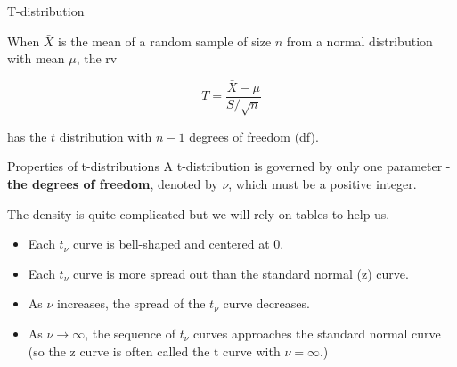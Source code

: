 \documentclass[
  ignorenonframetext,
]{beamer}
\providecommand{\tightlist}{%
  \setlength{\itemsep}{0pt}\setlength{\parskip}{0pt}}\usepackage{longtable,booktabs,array}
\begin{document}
\begin{frame}{T-distribution}
\protect\hypertarget{t-distribution}{}
\begin{tcolorbox}[enhanced jigsaw, titlerule=0mm, colbacktitle=quarto-callout-important-color!10!white, opacityback=0, bottomrule=.15mm, colback=white, colframe=quarto-callout-important-color-frame, arc=.35mm, title=\textcolor{quarto-callout-important-color}{\faExclamation}\hspace{0.5em}{Theorem}, toprule=.15mm, breakable, coltitle=black, leftrule=.75mm, bottomtitle=1mm, left=2mm, rightrule=.15mm, toptitle=1mm, opacitybacktitle=0.6]

When \(\bar{X}\) is the mean of a random sample of size \(n\) from a
normal distribution with mean \(\mu\), the rv

\[ 
T = \frac{\bar{X} - \mu}{S/\sqrt{n}} 
\]

has the \(t\) distribution with \(n-1\) degrees of freedom (df).

\end{tcolorbox}
\end{frame}

\begin{frame}{Properties of t-distributions}
\protect\hypertarget{properties-of-t-distributions}{}
A t-distribution is governed by only one parameter - \textbf{the degrees
of freedom}, denoted by \(\nu\), which must be a positive integer.

The density is quite complicated but we will rely on tables to help us.

\begin{tcolorbox}[enhanced jigsaw, titlerule=0mm, colbacktitle=quarto-callout-important-color!10!white, opacityback=0, bottomrule=.15mm, colback=white, colframe=quarto-callout-important-color-frame, arc=.35mm, title=\textcolor{quarto-callout-important-color}{\faExclamation}\hspace{0.5em}{Properties}, toprule=.15mm, breakable, coltitle=black, leftrule=.75mm, bottomtitle=1mm, left=2mm, rightrule=.15mm, toptitle=1mm, opacitybacktitle=0.6]

\begin{itemize}[<+->]
\tightlist
\item
  Each \(t_{\nu}\) curve is bell-shaped and centered at 0.
\item
  Each \(t_{\nu}\) curve is more spread out than the standard normal (z)
  curve.
\item
  As \(\nu\) increases, the spread of the \(t_{\nu}\) curve decreases.
\item
  As \(\nu \rightarrow \infty\), the sequence of \(t_{\nu}\) curves
  approaches the standard normal curve (so the z curve is often called
  the t curve with \(\nu = \infty\).)
\end{itemize}

\end{tcolorbox}
\end{frame}
\end{document}
